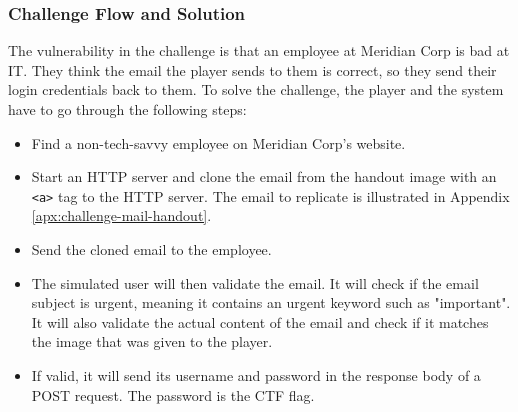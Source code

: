 
\subsubsection{Challenge Flow and Solution}

The vulnerability in the challenge is that an employee at Meridian Corp is bad at IT. They think the email the player sends to them is correct, so they send their login credentials back to them. To solve the challenge, the player and the system have to go through the following steps:

\begin{itemize}
    \item Find a non-tech-savvy employee on Meridian Corp's website.
    \item Start an HTTP server and clone the email from the handout image with an \texttt{<a>} tag to the HTTP server. The email to replicate is illustrated in Appendix \ref{apx:challenge-mail-handout}.
    \item Send the cloned email to the employee.
    \item The simulated user will then validate the email. It will check if the email subject is urgent, meaning it contains an urgent keyword such as "important". It will also validate the actual content of the email and check if it matches the image that was given to the player.
    \item If valid, it will send its username and password in the response body of a POST request. The password is the CTF flag.
\end{itemize}


